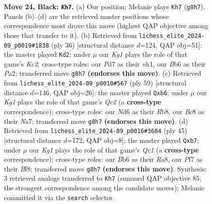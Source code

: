 \documentclass[11pt]{article}
\begin{document}
\begin{figure}[p]
\caption{\textbf{Move 24, Black: \texttt{Kh7}.} (a) Our position; Melanie plays \texttt{Kh7} (\texttt{g8h7}). Panels (b)--(d) are the retrieved master positions whose correspondence most drove this move (highest QAP objective among those that transfer to it). (b) Retrieved from \texttt{lichess\_elite\_2024-09\_p0019\#1838} (ply 36) [structural distance $d$=124, QAP obj=51]: the master played \texttt{Kd2}; under $\mu$ our \emph{Kg1} plays the role of that game's \emph{Kc2}; cross-type roles: our \emph{P}d7 as their \emph{n}h1, our \emph{B}b6 as their \emph{P}a2; transferred move \texttt{g8h7} \textbf{(endorses this move)}. (c) Retrieved from \texttt{lichess\_elite\_2024-09\_p0010\#567} (ply 59) [structural distance $d$=146, QAP obj=26]: the master played \texttt{Qxb6}; under $\mu$ our \emph{Kg1} plays the role of that game's \emph{Qc2} (a \textbf{cross-type} correspondence); cross-type roles: our \emph{N}d6 as their \emph{R}b8, our \emph{B}c8 as their \emph{N}a7; transferred move \texttt{g8h7} \textbf{(endorses this move)}. (d) Retrieved from \texttt{lichess\_elite\_2024-09\_p0016\#3684} (ply 45) [structural distance $d$=172, QAP obj=8]: the master played \texttt{Qxb7}; under $\mu$ our \emph{Kg1} plays the role of that game's \emph{Qc1} (a \textbf{cross-type} correspondence); cross-type roles: our \emph{B}b6 as their \emph{R}a8, our \emph{P}f7 as their \emph{B}f8; transferred move \texttt{g8h7} \textbf{(endorses this move)}. Synthesis: 3 retrieved analogs transferred to \texttt{Kh7} (summed QAP objective 85, the strongest correspondence among the candidate moves); Melanie committed it via the \texttt{search} selector.}
\label{fig:thought-m47}
\end{figure}

\clearpage
\end{document}
